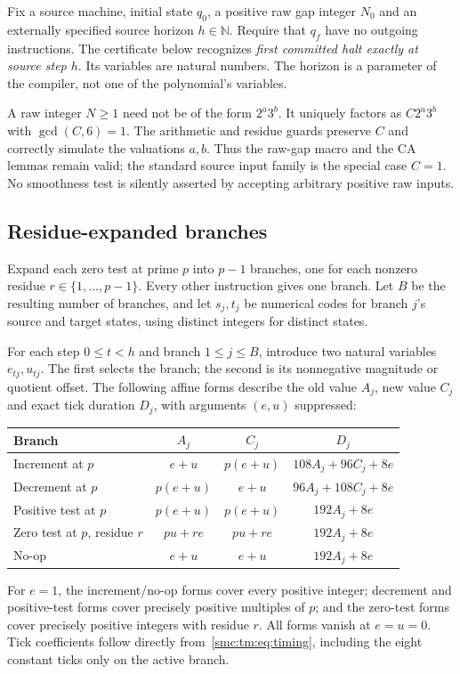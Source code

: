 \documentclass[11pt,letterpaper]{article}
\numberwithin{equation}{section}
\theoremstyle{definition}
\theoremstyle{remark}
\newcommand{\NN}{\mathbb N}
\begin{document}
Fix a source machine, initial state $q_0$, a positive raw gap integer $N_0$ and an externally specified source horizon $h\in\NN$. Require that $q_f$ have no outgoing instructions. The certificate below recognizes \emph{first committed halt exactly at source step $h$}. Its variables are natural numbers. The horizon is a parameter of the compiler, not one of the polynomial's variables.

A raw integer $N\ge1$ need not be of the form $2^a3^b$. It uniquely factors as $C2^a3^b$ with $\gcd(C,6)=1$. The arithmetic and residue guards preserve $C$ and correctly simulate the valuations $a,b$. Thus the raw-gap macro and the CA lemmas remain valid; the standard source input family is the special case $C=1$. No smoothness test is silently asserted by accepting arbitrary positive raw inputs.

\subsection{Residue-expanded branches}

Expand each zero test at prime $p$ into $p-1$ branches, one for each nonzero residue $r\in\{1,\ldots,p-1\}$. Every other instruction gives one branch. Let $B$ be the resulting number of branches, and let $s_j,t_j$ be numerical codes for branch $j$'s source and target states, using distinct integers for distinct states.

For each step $0\le t<h$ and branch $1\le j\le B$, introduce two natural variables $e_{tj},u_{tj}$. The first selects the branch; the second is its nonnegative magnitude or quotient offset. The following affine forms describe the old value $A_j$, new value $C_j$ and exact tick duration $D_j$, with arguments $(e,u)$ suppressed:
\begin{center}
\begin{tabular}{@{}lccc@{}}
\toprule
Branch&$A_j$&$C_j$&$D_j$\\
\midrule
Increment at $p$&$e+u$&$p(e+u)$&$108A_j+96C_j+8e$\\
Decrement at $p$&$p(e+u)$&$e+u$&$96A_j+108C_j+8e$\\
Positive test at $p$&$p(e+u)$&$p(e+u)$&$192A_j+8e$\\
Zero test at $p$, residue $r$&$pu+re$&$pu+re$&$192A_j+8e$\\
No-op&$e+u$&$e+u$&$192A_j+8e$\\
\bottomrule
\end{tabular}
\end{center}
For $e=1$, the increment/no-op forms cover every positive integer; decrement and positive-test forms cover precisely positive multiples of $p$; and the zero-test forms cover precisely positive integers with residue $r$. All forms vanish at $e=u=0$. Tick coefficients follow directly from~\eqref{smc:tm:eq:timing}, including the eight constant ticks only on the active branch.
\end{document}
